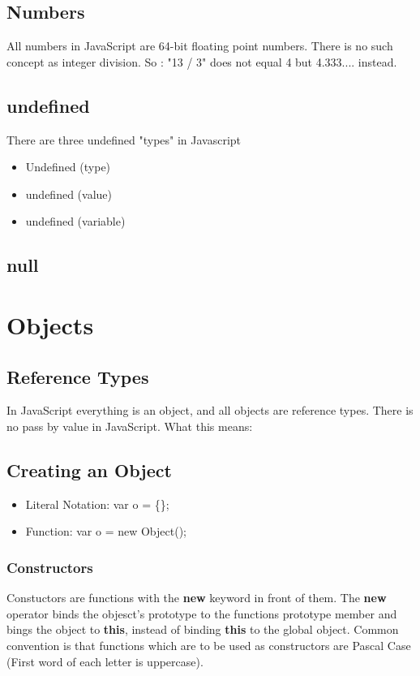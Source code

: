 \documentclass {amsart}
\begin{document}
\subsection{Numbers}
	All numbers in JavaScript are 64-bit floating point numbers.  There is no such concept as integer division.  So :  "13 / 3" does not equal 4 but 4.333.... instead.

\subsection {undefined}
	There are three undefined "types" in Javascript 
	\begin{itemize}
		\item Undefined (type)
		\item undefined (value)
		\item undefined (variable)
	\end{itemize}


\subsection {null}


\section{Objects}
	\subsection {Reference Types}
		In JavaScript everything is an object, and all objects are reference types.  There is no pass by value in JavaScript.  
		What this means: 
	
	\subsection{Creating an Object}
		\begin{itemize}
			\item Literal Notation: var o = \{\};
			\item Function: var o = new Object();
		\end{itemize}
		\subsubsection{Constructors} Constuctors are functions with the {\bf new} keyword in front of them.  The {\bf new} operator binds the objesct's prototype to the functions prototype member and bings the object to {\bf this}, instead of binding {\bf this} to the global object.  Common convention is that functions which are to be used as constructors are Pascal Case (First word of each letter is uppercase).  
\end{document}

